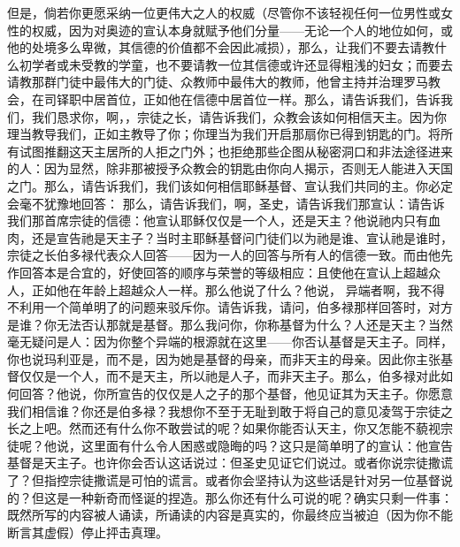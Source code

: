 但是，倘若你更愿采纳一位更伟大之人的权威（尽管你不该轻视任何一位男性或女性的权威，因为对奥迹的宣认本身就赋予他们分量——无论一个人的地位如何，或他的处境多么卑微，其信德的价值都不会因此减损），那么，让我们不要去请教什么初学者或未受教的学童，也不要请教一位其信德或许还显得粗浅的妇女；而要去请教那群门徒中最伟大的门徒、众教师中最伟大的教师，他曾主持并治理罗马教会，在司铎职中居首位，正如他在信德中居首位一样。那么，请告诉我们，告诉我们，我们恳求你，啊，，宗徒之长，请告诉我们，众教会该如何相信天主。因为你理当教导我们，正如主教导了你；你理当为我们开启那扇你已得到钥匙的门。将所有试图推翻这天主居所的人拒之门外；也拒绝那些企图从秘密洞口和非法途径进来的人：因为显然，除非那被授予众教会的钥匙由你向人揭示，否则无人能进入天国之门。那么，请告诉我们，我们该如何相信耶稣基督、宣认我们共同的主。你必定会毫不犹豫地回答：\newline{} 那么，请告诉我们，啊，圣史，请告诉我们那宣认：请告诉我们那首席宗徒的信德：他宣认耶稣仅仅是一个人，还是天主？他说祂内只有血肉，还是宣告祂是天主子？当时主耶稣基督问门徒们以为祂是谁、宣认祂是谁时，宗徒之长伯多禄代表众人回答——因为一人的回答与所有人的信德一致。而由他先作回答本是合宜的，好使回答的顺序与荣誉的等级相应：且使他在宣认上超越众人，正如他在年龄上超越众人一样。那么他说了什么？他说， 异端者啊，我不得不利用一个简单明了的问题来驳斥你。请告诉我，请问，伯多禄那样回答时，对方是谁？你无法否认那就是基督。那么我问你，你称基督为什么？人还是天主？当然毫无疑问是人：因为你整个异端的根源就在这里——你否认基督是天主子。同样，你也说玛利亚是，而不是，因为她是基督的母亲，而非天主的母亲。因此你主张基督仅仅是一个人，而不是天主，所以祂是人子，而非天主子。那么，伯多禄对此如何回答？他说，你所宣告的仅仅是人之子的那个基督，他见证其为天主子。你愿意我们相信谁？你还是伯多禄？我想你不至于无耻到敢于将自己的意见凌驾于宗徒之长之上吧。然而还有什么你不敢尝试的呢？如果你能否认天主，你又怎能不藐视宗徒呢？他说，这里面有什么令人困惑或隐晦的吗？这只是简单明了的宣认：他宣告基督是天主子。也许你会否认这话说过：但圣史见证它们说过。或者你说宗徒撒谎了？但指控宗徒撒谎是可怕的谎言。或者你会坚持认为这些话是针对另一位基督说的？但这是一种新奇而怪诞的捏造。那么你还有什么可说的呢？确实只剩一件事：既然所写的内容被人诵读，所诵读的内容是真实的，你最终应当被迫（因为你不能断言其虚假）停止抨击真理。\par

